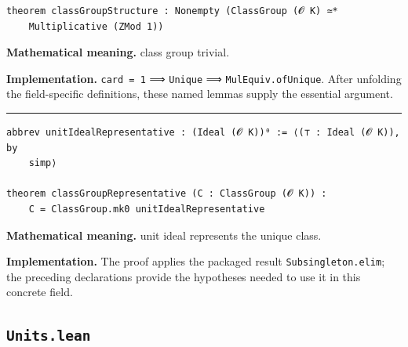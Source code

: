 \documentclass[UTF8,a4paper,11pt,fontset=fandol]{ctexart}
\theoremstyle{definition}
\newcommand{\statementsep}{\par\medskip\hrule\medskip}
\begin{document}
\begin{verbatim}
theorem classGroupStructure : Nonempty (ClassGroup (𝓞 K) ≃*
    Multiplicative (ZMod 1))
\end{verbatim}
\noindent\textbf{Mathematical meaning.} class group trivial.\par
\noindent\textbf{Implementation.} \texttt{card = 1} ⟹ \texttt{Unique} ⟹ \texttt{MulEquiv.\allowbreak{}ofUnique}. After unfolding the field-specific definitions, these named lemmas supply the essential argument.\par
\statementsep
\begin{verbatim}
abbrev unitIdealRepresentative : (Ideal (𝓞 K))⁰ := ⟨(⊤ : Ideal (𝓞 K)), by
    simp⟩

theorem classGroupRepresentative (C : ClassGroup (𝓞 K)) :
    C = ClassGroup.mk0 unitIdealRepresentative
\end{verbatim}
\noindent\textbf{Mathematical meaning.} unit ideal represents the unique class.\par
\noindent\textbf{Implementation.} The proof applies the packaged result \texttt{Subsingleton.\allowbreak{}elim}; the preceding declarations provide the hypotheses needed to use it in this concrete field.\par

\subsection{\texttt{Units.lean}}
\end{document}
